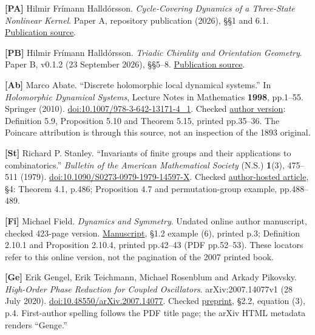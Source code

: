 \documentclass[
  11pt,
  a4paper,
]{article}
\begin{document}
\textbf{{[}PA{]}} Hilmir Frímann Halldórsson. \emph{Cycle-Covering Dynamics of a Three-State Nonlinear Kernel}. Paper A, repository publication (2026), §§1 and 6.1. \href{https://github.com/pzychozen/trioctagon-physics/blob/d0aa8d1cb19421ff441eacda0f83ec89fc3160b3/papers/PAPER_A/publication/paper_A_publication.md}{Publication source}.

\textbf{{[}PB{]}} Hilmir Frímann Halldórsson. \emph{Triadic Chirality and Orientation Geometry}. Paper B, v0.1.2 (23 September 2026), §§5--8. \href{https://github.com/pzychozen/trioctagon-physics/blob/d0aa8d1cb19421ff441eacda0f83ec89fc3160b3/papers/PAPER_B/publication/v0.1.2/PAPER_B_TRIADIC_CHIRALITY_AND_ORIENTATION_GEOMETRY_PUBLICATION_v0.1.2.md}{Publication source}.

\textbf{{[}Ab{]}} Marco Abate. ``Discrete holomorphic local dynamical systems.'' In \emph{Holomorphic Dynamical Systems}, Lecture Notes in Mathematics \textbf{1998}, pp.1--55. Springer (2010). \href{https://doi.org/10.1007/978-3-642-13171-4_1}{doi:10.1007/978-3-642-13171-4\_1}. Checked \href{https://pagine.dm.unipi.it/abate/articoli/artric/files/DiscHolLocDynSys.pdf}{author version}: Definition 5.9, Proposition 5.10 and Theorem 5.15, printed pp.35--36. The Poincare attribution is through this source, not an inspection of the 1893 original.

\textbf{{[}St{]}} Richard P. Stanley. ``Invariants of finite groups and their applications to combinatorics.'' \emph{Bulletin of the American Mathematical Society} (N.S.) \textbf{1}(3), 475--511 (1979). \href{https://doi.org/10.1090/S0273-0979-1979-14597-X}{doi:10.1090/S0273-0979-1979-14597-X}. Checked \href{https://math.mit.edu/~rstan/pubs/pubfiles/38.pdf}{author-hosted article}, §4: Theorem 4.1, p.486; Proposition 4.7 and permutation-group example, pp.488--489.

\textbf{{[}Fi{]}} Michael Field. \emph{Dynamics and Symmetry}. Undated online author manuscript, checked 423-page version. \href{https://chaosbook.org/library/FieldEquiv.pdf}{Manuscript}, §1.2 example (6), printed p.3; Definition 2.10.1 and Proposition 2.10.4, printed pp.42--43 (PDF pp.52--53). These locators refer to this online version, not the pagination of the 2007 printed book.

\textbf{{[}Ge{]}} Erik Gengel, Erik Teichmann, Michael Rosenblum and Arkady Pikovsky. \emph{High-Order Phase Reduction for Coupled Oscillators}. arXiv:2007.14077v1 (28 July 2020). \href{https://doi.org/10.48550/arXiv.2007.14077}{doi:10.48550/arXiv.2007.14077}. Checked \href{https://arxiv.org/pdf/2007.14077v1}{preprint}, §2.2, equation (3), p.4. First-author spelling follows the PDF title page; the arXiv HTML metadata renders ``Genge.''
\end{document}
